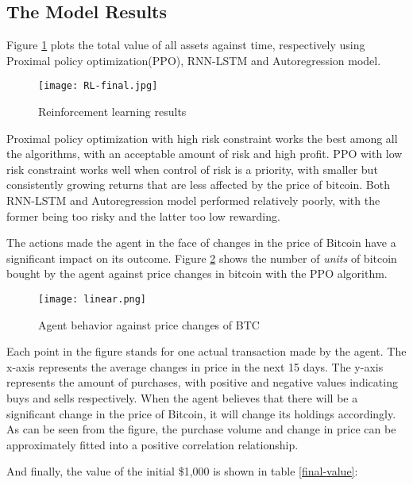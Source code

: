\documentclass{mcmthesis}
\begin{document}
\lipsum[45]

\subsection{The Model Results}

Figure \ref{RL-Results}  plots the total value of all assets against time,
respectively using Proximal policy optimization(PPO), RNN-LSTM and Autoregression model.

\begin{figure}[h]
  \small
  \centering
  \texttt{[image: RL-final.jpg]}
  \caption{Reinforcement learning results} \label{RL-Results}
\end{figure}

Proximal policy optimization with high risk constraint works the best among all the algorithms, with an acceptable amount of risk and high profit. PPO with low risk constraint works well when control of risk is a priority, with smaller but consistently growing returns that are less affected by the price of bitcoin. Both RNN-LSTM and Autoregression model performed relatively poorly, with the former being too risky and the latter too low rewarding.

The actions made the agent in the face of changes in the price of Bitcoin have a significant impact on its outcome.
Figure \ref{BTC} shows the number of \textit{units} of bitcoin bought by the agent against price changes in bitcoin with the PPO algorithm.

\begin{figure}[h]
  \small
  \centering
  \texttt{[image: linear.png]}
  \caption{Agent behavior against price changes of BTC} \label{BTC}
\end{figure}

Each point in the figure stands for one actual transaction made by the agent.
The x-axis represents the average changes in price in the next 15 days.
The y-axis represents the amount of purchases, with positive and negative values indicating buys and sells respectively.
When the agent believes that there will be a significant change in the price of Bitcoin, it will change its holdings accordingly.
As can be seen from the figure, the purchase volume and change in price can be approximately fitted into a positive correlation relationship.

And finally, the value of the initial \$1,000 is shown in table \ref{final-value}:
\end{document}
